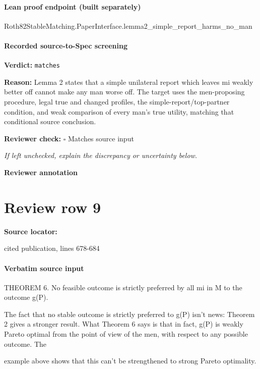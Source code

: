\documentclass[10pt]{article}
\newcommand{\reviewerbox}{%
  \par\noindent\fbox{\parbox{0.96\linewidth}{\rule{0pt}{0.38in}}}\par
}
\newcommand{\reviewmatch}[1]{%
  \par\noindent\textbf{Reviewer check:} $\square$\; #1\par
  \noindent\emph{If left unchecked, explain the discrepancy or uncertainty below.}\par
}
\begin{document}
\paragraph{Lean proof endpoint (built separately)}\begin{ReviewVerbatim}
Roth82StableMatching.PaperInterface.lemma2_simple_report_harms_no_man
\end{ReviewVerbatim}

\paragraph{Recorded source-to-Spec screening}
\textbf{Verdict:} \texttt{matches}
\\
{\raggedright
\textbf{Reason:} Lemma 2 states that a simple unilateral report which leaves mi weakly better off cannot make any man worse off.\allowbreak{}  The target uses the men-\allowbreak{}proposing procedure, legal true and changed profiles, the simple-\allowbreak{}report/\allowbreak{}top-\allowbreak{}partner condition, and weak comparison of every man's true utility, matching that conditional source conclusion.\allowbreak{}
\par}
\reviewmatch{Matches source input}
\noindent\textbf{Reviewer annotation}\par
\reviewerbox
\clearpage
\hypertarget{source-claim-c7ba28726e90028a}{}
\section*{Review row 9}
\textbf{Source locator:} {\footnotesize\raggedright cited publication, lines 678-\allowbreak{}684\par}
\paragraph{Verbatim source input}
\begin{ReviewVerbatim}
THEOREM 6. No feasible outcome is strictly preferred by all mi in M to the outcome g(P).

The fact that no stable outcome is strictly preferred to g(P) isn't news: Theorem 2
gives a stronger result. What Theorem 6 says is that in fact, g(P) is weakly Pareto
optimal from the point of view of the men, with respect to any possible outcome. The

example above shows that this can't be strengthened to strong Pareto optimality.
\end{ReviewVerbatim}
\end{document}
